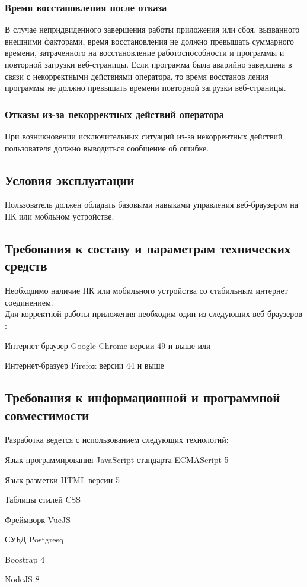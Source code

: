 \subsubsection{Время восстановления после отказа}
В случае непридвиденного завершения работы приложения или сбоя, вызванного
внешними факторами, время восстановления не должно превышать суммарного времени,
затраченного на восстановление работоспособности и программы и повторной загрузки веб-страницы.
Если программа была аварийно завершена в связи с некорректными действиями оператора, 
то время восстанов ления программы не должно превышать времени повторной загрузки веб-страницы.

\subsubsection{Отказы из-за некорректных действий оператора}
При возникновении исключительных ситуаций из-за некоррентных действий
пользователя должно выводиться сообщение об ошибке.

\subsection{Условия эксплуатации}
Пользователь должен обладать базовыми навыками управления веб-браузером
на ПК или мобльном устройстве.

\subsection{Требования к составу и параметрам технических средств}
Необходимо наличие ПК или мобильного устройства со стабильным интернет соединением.\\
Для корректной работы приложения необходим один из следующих веб-браузеров \cite{css_grid}:
\begin{my_enumerate}
  \item Интернет-браузер Google Chrome версии 49 и выше или
  \item Интернет-бразуер Firefox версии 44 и выше
\end{my_enumerate}

\subsection{Требования к информационной и программной совместимости}
Разработка ведется с использованием следующих технологий:
\begin{my_enumerate}
  \item Язык программирования JavaScript стандарта ECMAScript 5
  \item Язык разметки HTML версии 5
  \item Таблицы стилей CSS
  \item Фреймворк VueJS
  \item СУБД Postgresql
  \item Boostrap 4
  \item NodeJS 8
\end{my_enumerate}

